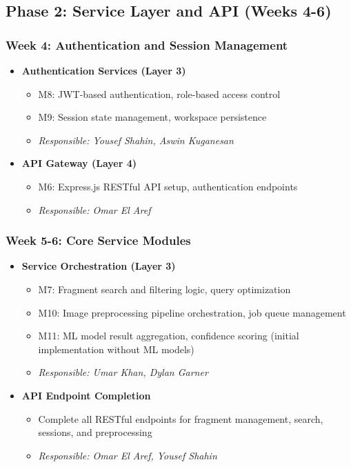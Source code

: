 \documentclass[12pt, titlepage]{article}
\begin{document}
\subsection{Phase 2: Service Layer and API (Weeks 4-6)}

\subsubsection{Week 4: Authentication and Session Management}
\begin{itemize}
    \item \textbf{Authentication Services (Layer 3)}
    \begin{itemize}
        \item M8: JWT-based authentication, role-based access control
        \item M9: Session state management, workspace persistence
        \item \textit{Responsible: Yousef Shahin, Aswin Kuganesan}
    \end{itemize}
    \item \textbf{API Gateway (Layer 4)}
    \begin{itemize}
        \item M6: Express.js RESTful API setup, authentication endpoints
        \item \textit{Responsible: Omar El Aref}
    \end{itemize}
\end{itemize}

\subsubsection{Week 5-6: Core Service Modules}
\begin{itemize}
    \item \textbf{Service Orchestration (Layer 3)}
    \begin{itemize}
        \item M7: Fragment search and filtering logic, query optimization
        \item M10: Image preprocessing pipeline orchestration, job queue management
        \item M11: ML model result aggregation, confidence scoring (initial implementation without ML models)
        \item \textit{Responsible: Umar Khan, Dylan Garner}
    \end{itemize}
    \item \textbf{API Endpoint Completion}
    \begin{itemize}
        \item Complete all RESTful endpoints for fragment management, search, sessions, and preprocessing
        \item \textit{Responsible: Omar El Aref, Yousef Shahin}
    \end{itemize}
\end{itemize}
\end{document}
